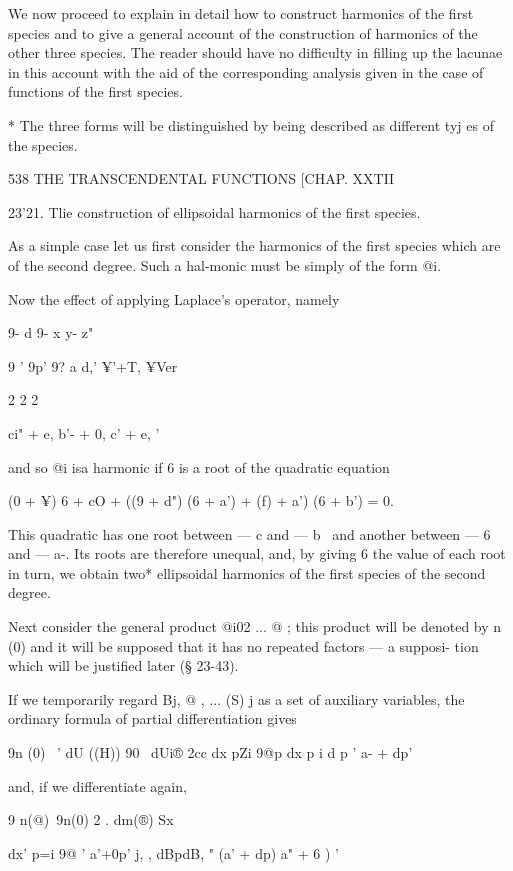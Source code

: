 We now proceed to explain in detail how to construct harmonics of the 
first species and to give a general account of the construction of harmonics of 
the other three species. The reader should have no difficulty in filling up 
the lacunae in this account with the aid of the corresponding analysis given 
in the case of functions of the first species. 

* The three forms will be distinguished by being described as different tyj es of the species. 



538 THE TRANSCENDENTAL FUNCTIONS [CHAP. XXTII 

23'21. Tlie construction of ellipsoidal harmonics of the first species. 

As a simple case let us first consider the harmonics of the first species 
which are of the second degree. Such a hal-monic must be simply of the 
form @i. 

Now the effect of applying Laplace's operator, namely 

9- d  9- x  y- z" 

9 ' 9p' 9?  a d,'  ¥'+T, ¥Ver 

2 2 2 

ci" + e, b'- + 0, c' + e, ' 

and so @i isa harmonic if 6  is a root of the quadratic equation 

(0 + ¥)  6 + cO + ((9 + d") (6 + a') + (f) + a') (6 + b') = 0. 

This quadratic has one root between — c  and — b~ and another between 
— 6  and — a-. Its roots are therefore unequal, and, by giving 6  the value of 
each root in turn, we obtain two* ellipsoidal harmonics of the first species 
of the second degree. 

Next consider the general product @i02 ... @  ; this product will be denoted 
by n (0) and it will be supposed that it has no repeated factors — a supposi- 
tion which will be justified later (§ 23-43). 

If we temporarily regard Bj, @ , ... (S) j as a set of auxiliary variables, the 
ordinary formula of partial differentiation gives 

9n (0) \  '  dU ((H)) 90  \    dUi®  2cc 
dx pZi 9@p dx p i d p ' a- + dp' 

and, if we differentiate again, 

9 n(@)\    9n(0) 2 . dm(®) Sx  



dx' p=i 9@  ' a'+0p' j, , dBpdB, " (a' + dp)  a" + 6 ) ' 


